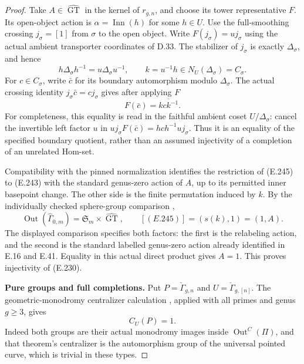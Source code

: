 \begin{proof}
Take $A\in\widehat{\operatorname{GT}}$ in the kernel of
$r_{g,n}$, and choose its tower representative $F$.
Its open-object action is $\alpha=\operatorname{Inn}(h)$
for some $h\in U$.
Use the full-smoothing crossing $j_\sigma=[1]$ from
$\sigma$ to the open object.  Write
$F(j_\sigma)=u j_\sigma$ using the actual ambient
transporter coordinates of D.33.
The stabilizer of $j_\sigma$ is exactly
$\Delta_\sigma$, and hence
\[
 h\Delta_\sigma h^{-1}=u\Delta_\sigma u^{-1},
 \qquad k=u^{-1}h\in N_U(\Delta_\sigma)=C_\sigma.
                                                               \tag{E.244}
\]
For $c\in C_\sigma$, write $\bar c$ for its boundary
automorphism modulo $\Delta_\sigma$.
The actual crossing identity $j_\sigma\bar c=cj_\sigma$
gives after applying $F$
\[
             F(\bar c)=\overline{kck^{-1}}.
                                                               \tag{E.245}
\]
For completeness, this equality is read in the faithful
ambient coset $U/\Delta_\sigma$: cancel the invertible
left factor $u$ in
$u j_\sigma F(\bar c)=hch^{-1}u j_\sigma$.
Thus it is an equality of the specified boundary
quotient, rather than an assumed injectivity of a
completion of an unrelated Hom-set.

Compatibility with the pinned normalization identifies
the restriction of (E.245) to (E.243) with the standard
genus-zero action of $A$, up to its permitted inner
basepoint change.  The other side is the finite
permutation induced by $k$.
By the individually checked sphere-group comparison
\cite[Corollary 2.8(i)]{ET_HMM2022},
\[
 \operatorname{Out}(\widehat\Gamma_{0,m})
            =\mathfrak S_m\times\widehat{\operatorname{GT}},
 \qquad
       [(E.245)]=(s(k),1)=(1,A).
                                                               \tag{E.246}
\]
The displayed comparison specifies both factors: the
first is the relabeling action, and the second is the
standard labelled genus-zero action already identified
in E.16 and E.41.  Equality in this actual direct
product gives $A=1$.  This proves injectivity of
(E.230).

\textbf{Pure groups and full completions.}
Put $P=\check\Gamma_{g,n}$ and $U=\check\Gamma_{g,[n]}$.
The geometric-monodromy centralizer calculation
\cite[Theorem 6.13(ii)]{ET_HMTopicsI2012}, applied with
all primes and genus $g\geq3$, gives
\[
                   C_U(P)=1.
                                                               \tag{E.247}
\]
Indeed both groups are their actual monodromy images
inside $\operatorname{Out}^{C}(\Pi)$, and that theorem's
centralizer is the automorphism group of the universal
pointed curve, which is trivial in these types.


\end{proof}
